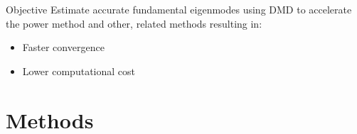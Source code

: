 \documentclass[fleqn]{beamer}
\newcommand{\mat}[1]{\ensuremath{\bm{#1}}}
\renewcommand{\vec}[1]{\ensuremath{\bm{#1}}}
\begin{document}
\begin{frame}{} %
    \begin{block}{Objective}
        Estimate accurate fundamental eigenmodes using DMD to accelerate the power method and other, related methods resulting in:
        \begin{itemize}
            \item Faster convergence
            \item Lower computational cost
        \end{itemize}
    \end{block}
\end{frame}

\section{Methods}
\end{document}
